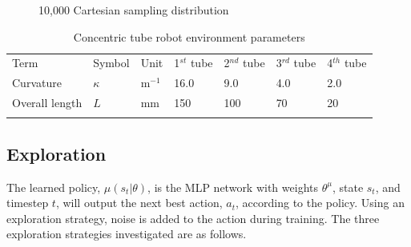 \begin{figure}
    \caption{10,000 Cartesian sampling distribution}
    \label{fig:cartesian-sampling}%
\end{figure}

\begin{table}
\begin{tabular}{lllllll}
\hline\noalign{\smallskip}
Term & Symbol & Unit & 1$^{st}$ tube & 2$^{nd}$ tube & 3$^{rd}$ tube & 4$^{th}$ tube\\
\noalign{\smallskip}\hline\noalign{\smallskip}
Curvature & $\kappa$ & m$^{-1}$ & 16.0 & 9.0 & 4.0 & 2.0\\
Overall length & $L$ & mm & 150 & 100 & 70 & 20\\
\noalign{\smallskip}\hline
\end{tabular}
\caption{Concentric tube robot environment parameters}
\label{tab:tube-env-params}
\end{table}

\subsection{Exploration}
The learned policy, $\mu(s_t | \theta)$, is the MLP network with weights $\theta^\mu$, state $s_t$, and timestep $t$, will output the next best action, $a_t$, according to the policy. Using an exploration strategy, noise is added to the action during training. The three exploration strategies investigated are as follows.

